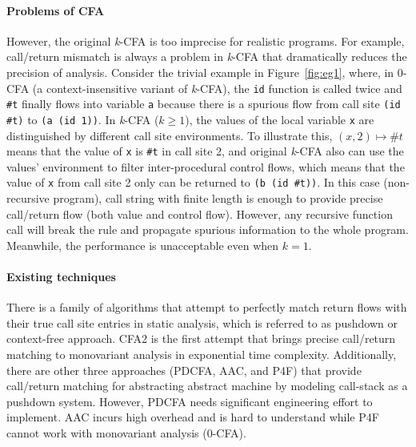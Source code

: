 \documentclass{article}
\begin{document}
\paragraph{Problems of CFA}
However, the original \textit{k}-CFA is too imprecise for realistic programs.
For example, call/return mismatch is always a problem in \textit{k}-CFA that dramatically reduces the precision of analysis.
Consider the trivial example in Figure~\ref{fig:eg1}, where, in 0-CFA (a context-insensitive variant of \textit{k}-CFA), the \verb|id| function is called twice and \verb|#t| finally flows into variable \verb|a| because there is a spurious flow from call site \verb|(id #t)| to \verb|(a (id 1))|.
In \textit{k}-CFA ($k \geq 1$), the values of the local variable \verb|x| are distinguished by different call site environments.
To illustrate this, $(x, 2) \mapsto \#t$ means that the value of \verb|x| is \verb|#t| in call site 2, and original \textit{k}-CFA also can use the values' environment to filter inter-procedural control flows, which means that the value of \verb|x| from call site 2 only can be returned to \verb|(b (id #t))|.
In this case (non-recursive program), call string with finite length is enough to provide precise call/return flow (both value and control flow).
However, any recursive function call will break the rule and propagate spurious information to the whole program.
Meanwhile, the performance is unacceptable even when $k = 1$.

\paragraph{Existing techniques}
There is a family of algorithms that attempt to perfectly match return flows with their true call site entries in static analysis, which is referred to as pushdown or context-free approach.
CFA2 is the first attempt that brings precise call/return matching to monovariant analysis in exponential time complexity.
Additionally, there are other three approaches (PDCFA, AAC, and P4F) that provide call/return matching for abstracting abstract machine by modeling call-stack as a pushdown system.
However, PDCFA needs significant engineering effort to implement.
AAC incurs high overhead and is hard to understand while P4F cannot work with monovariant analysis (0-CFA).
\end{document}
